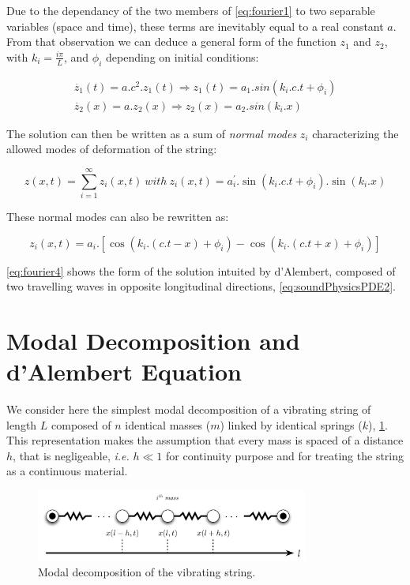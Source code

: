Due to the dependancy of the two members of \myequname \eqref{eq:fourier1} to two separable variables (space and time), these terms are inevitably equal to a real constant $a$. From that observation we can deduce a general form of the function $z_1$ and $z_2$, with $k_i = \frac{i\pi}{L}$, and $\phi_i$ depending on initial conditions:

$$
\begin{array}{c}
   	\ddot{z_1}(t) = a . c^2 . z_1(t) \Rightarrow z_1(t) = a_1 . sin(k_i . c . t + \phi_i)  \label{eq:fourier2} \\
	\ddot{z_2}(x) = a . z_2(x) \Rightarrow z_2(x) = a_2 . sin(k_i . x) \label{eq:fourier3}
\end{array}
$$

The solution can then be written as a sum of \emph{normal modes} $z_i$ characterizing the allowed modes of deformation of the string:

$$
	z(x, t) = \sum_{i=1}^{\infty} z_i(x, t)\ with\ z_i(x, t) =  a_{i}^{'} . \sin(k_i . c .t + \phi_i) . \sin(k_i . x)
$$

These normal modes can also be rewritten as:

\begin{equation}
	z_i(x, t) = a_i . [ \cos(k_i.(c.t - x) + \phi_i) - \cos(k_i.(c.t + x) + \phi_i) ]
	\label{eq:fourier4}
\end{equation}

\myequname \eqref{eq:fourier4} shows the form of the solution intuited by d'Alembert, composed of two travelling waves in opposite longitudinal directions, \myequname \eqref{eq:soundPhysicsPDE2}.

\newpage\vfill


	\section{Modal Decomposition and d'Alembert Equation}
	\label{sec:ssDerivation:modalDecomposition}

We consider here the simplest modal decomposition of a vibrating string of length $L$ composed of $n$ identical masses ($m$) linked by identical springs ($k$), \myfigname \ref{fig:modalDecomposition}. This representation makes the assumption that every mass is spaced of a distance $h$, that is negligeable, \emph{i.e.} $h \ll 1$ for continuity purpose and for treating the string as a continuous material.

\begin{figure}[H]
	\begin{center}
		\includegraphics[width=0.8\textwidth]{Appendices/A/Pics/Pdf/ModalDecomposition.pdf}
	\end{center}
	\vspace{-0.5cm}
	\caption[Modal decomposition of the vibrating string]{Modal decomposition of the vibrating string.}
	\label{fig:modalDecomposition}
\end{figure}
	
